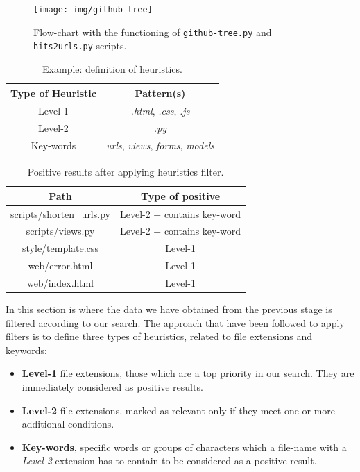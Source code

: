 \documentclass[a4paper, 12pt]{book}
\begin{document}
\begin{figure}
  \centering
  \texttt{[image: img/github-tree]}
  \caption{Flow-chart with the functioning of \texttt{github-tree.py} and \texttt{hits2urls.py} scripts.}
  \label{fig:gh-tree-diagram}
\end{figure}
\begin{table}[]
\centering
\caption{Example: definition of heuristics.}
\label{table:heuristics-table-example}
\begin{tabular}{|c|c|}
\hline
\textbf{Type of Heuristic} & \textbf{Pattern(s)}                                            \\ \hline
Level-1                    & \textit{.html}, \textit{.css}, \textit{.js}                    \\ \hline
Level-2                    & \textit{.py}                                                   \\ \hline
Key-words                  & \textit{urls}, \textit{views}, \textit{forms}, \textit{models} \\ \hline
\end{tabular}
\end{table}
\begin{table}[]
\centering
\caption{Positive results after applying heuristics filter.}
\label{table:heuristics-positive-example}
\begin{tabular}{|c|c|}
\hline
\textbf{Path}              & \textbf{Type of positive}   \\ \hline
scripts/shorten\_urls.py & Level-2 + contains key-word   \\
scripts/views.py           & Level-2 + contains key-word \\
style/template.css         & Level-1                     \\
web/error.html             & Level-1                     \\
web/index.html             & Level-1                     \\ \hline
\end{tabular}
\end{table}
In this section is where the data we have obtained from the previous stage is filtered according to our search.
The approach that have been followed to apply filters is to define three types of heuristics, related to
file extensions and keywords:
\begin{itemize}
  \item \textbf{Level-1} file extensions, those which are a top priority in our search. They are immediately considered
   as positive results.
  \item \textbf{Level-2} file extensions, marked as relevant only if they meet one or more additional conditions.
  \item \textbf{Key-words}, specific words or groups of characters which a file-name with a \textit{Level-2} extension
  has to contain to be considered as a positive result.
\end{itemize}
\end{document}
